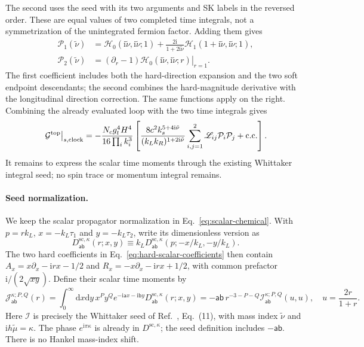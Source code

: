 \documentclass[a4paper,12pt]{article}
\newcommand{\ii}{\mathrm i}
\newcommand{\tn}{\tilde\nu}
\def\aa{\mathsf a}
\newcommand{\bb}{\mathsf b}
\newcommand{\di}{\mathrm d}
\newcommand{\G}{\mathcal G}
\newcommand{\Dsc}[1]{D^{\mathrm{sc},#1}}
\begin{document}
The second uses the seed with its two arguments and SK labels in
the reversed order. These are equal values of two completed time
integrals, not a symmetrization of the unintegrated fermion factor.
Adding them gives
\begin{align}
 \mathcal P_1(\tn)&=\mathcal H_0(\ii\tn,\ii\tn;1)
 +\frac{2\ii}{1+2\ii\tn}\mathcal H_1(1+\ii\tn,\ii\tn;1),\nonumber\\
 \mathcal P_2(\tn)&=
 \left.(\partial_r-1)\mathcal H_0(\ii\tn,\ii\tn;r)\right|_{r=1}.
 \label{eq:hard-result}
\end{align}
The first coefficient includes both the hard-direction expansion
and the two soft endpoint descendants; the second combines the
hard-magnitude derivative with the longitudinal direction correction.
The same functions apply on the right.
Combining the already evaluated loop with the two time integrals gives
\begin{equation}
 \left.\G^{\rm top}\right|_{s,\rm clock}
 =-\frac{N_cg_t^4H^4}{16\prod_i k_i^3}
 \left[
 \frac{8c^2 k_s^{5+4\ii\tn}}{(k_Lk_R)^{1+2\ii\tn}}
 \sum_{i,j=1}^2\mathscr L_{ij}\mathcal P_i\mathcal P_j
 +\mathrm{c.c.}\right].
 \label{eq:loop-first-assembled}
\end{equation}
It remains to express the scalar time moments through the existing
Whittaker integral seed; no spin trace or momentum integral remains.

\paragraph{Seed normalization.}
We keep the scalar propagator normalization in
Eq.~\eqref{eq:scalar-chemical}. With $p=rk_L$, $x=-k_L\tau_1$
and $y=-k_L\tau_2$, write its dimensionless version as
\[
 \Dsc{\kappa}_{\aa\bb}(r;x,y)
 \equiv k_L\Dsc{\kappa}_{\aa\bb}(p;-x/k_L,-y/k_L).
\]
The two hard coefficients in Eq.~\eqref{eq:hard-scalar-coefficients}
then contain $A_x=x\partial_x-\ii rx-1/2$ and
$R_x=-x\partial_x-\ii rx+1/2$, with common prefactor
$\ii/(2\sqrt{xy})$. Define their scalar time moments by
\begin{equation}
 \mathcal J_{\aa\bb}^{\kappa;P,Q}(r)
 =\int_0^\infty\di x\di y\,
 x^P y^Q e^{-\ii \aa x-\ii \bb y}\Dsc{\kappa}_{\aa\bb}(r;x,y)
 =-\aa\bb\,r^{-3-P-Q}\mathscr I_{\aa\bb}^{\kappa;P,Q}(u,u),
 \quad u=\frac{2r}{1+r}.
 \label{eq:seed-normalization}
\end{equation}
Here $\mathscr I$ is precisely the Whittaker seed of
Ref.~\cite{qin-seed}, Eq.~(11), with
mass index $\tn$ and $\ii h\widetilde\mu=\kappa$.
The phase $e^{\ii\pi\kappa}$ is already in $\Dsc{\kappa}$;
the seed definition includes $-\aa\bb$.
There is no Hankel mass-index shift.
\end{document}
